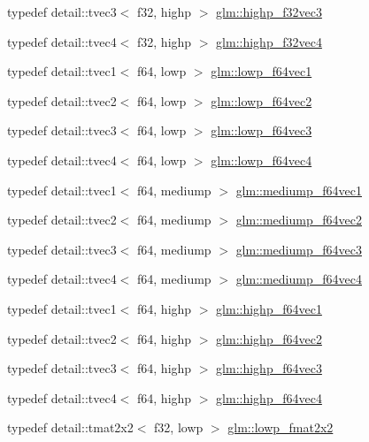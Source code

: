 \begin{CompactItemize}
typedef detail::tvec3$<$ f32, highp $>$ \hyperlink{group__gtc__type__precision_g581a4a4eb1f3a269d16af0c4e2d8daf4}{glm::highp\_\-f32vec3}
\item 
typedef detail::tvec4$<$ f32, highp $>$ \hyperlink{group__gtc__type__precision_g53d3c1a17e2e6f26ee5ad1e8879d710e}{glm::highp\_\-f32vec4}
\item 
typedef detail::tvec1$<$ f64, lowp $>$ \hyperlink{group__gtc__type__precision_g47d9eed23b6e3fc58676176be392293a}{glm::lowp\_\-f64vec1}
\item 
typedef detail::tvec2$<$ f64, lowp $>$ \hyperlink{group__gtc__type__precision_gf2c6cba98bb2c2f1560d8edff4b70938}{glm::lowp\_\-f64vec2}
\item 
typedef detail::tvec3$<$ f64, lowp $>$ \hyperlink{group__gtc__type__precision_gd2d5e1436d926ae7201c860dce01a0fe}{glm::lowp\_\-f64vec3}
\item 
typedef detail::tvec4$<$ f64, lowp $>$ \hyperlink{group__gtc__type__precision_gf99497c42a2d011fecab7f3f2312213d}{glm::lowp\_\-f64vec4}
\item 
typedef detail::tvec1$<$ f64, mediump $>$ \hyperlink{group__gtc__type__precision_g1e3bbbd9ce5e215c4ba0980264b2711d}{glm::mediump\_\-f64vec1}
\item 
typedef detail::tvec2$<$ f64, mediump $>$ \hyperlink{group__gtc__type__precision_g892891863b8e50195e3e48077a329335}{glm::mediump\_\-f64vec2}
\item 
typedef detail::tvec3$<$ f64, mediump $>$ \hyperlink{group__gtc__type__precision_ge2832f9acbf0cc1071fcf93336db6e0c}{glm::mediump\_\-f64vec3}
\item 
typedef detail::tvec4$<$ f64, mediump $>$ \hyperlink{group__gtc__type__precision_g0e011facac062fd7fb9b40c7d8288310}{glm::mediump\_\-f64vec4}
\item 
typedef detail::tvec1$<$ f64, highp $>$ \hyperlink{group__gtc__type__precision_g1054b4e4da2b907b35e1806bd6fbaef1}{glm::highp\_\-f64vec1}
\item 
typedef detail::tvec2$<$ f64, highp $>$ \hyperlink{group__gtc__type__precision_g1efd4982eaeafae59ce40deb89e018e7}{glm::highp\_\-f64vec2}
\item 
typedef detail::tvec3$<$ f64, highp $>$ \hyperlink{group__gtc__type__precision_g93cbac95bb9106fe15c987c0f56ae679}{glm::highp\_\-f64vec3}
\item 
typedef detail::tvec4$<$ f64, highp $>$ \hyperlink{group__gtc__type__precision_g1e9d8145fb9521701a5eeb6df5754184}{glm::highp\_\-f64vec4}
\item 
typedef detail::tmat2x2$<$ f32, lowp $>$ \hyperlink{group__gtc__type__precision_g99367a30c64035d7e7f76410105d10e3}{glm::lowp\_\-fmat2x2}

\end{CompactItemize}
